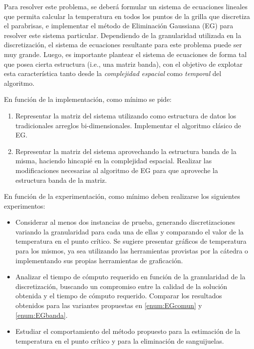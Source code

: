 \documentclass[11pt, a4paper]{article}
\newcommand{\atacante}{sanguijuela}
\newcommand{\objeto}{parabrisas}
\begin{document}
Para resolver este problema, se deber\'a formular un sistema de ecuaciones lineales que permita calcular la temperatura en todos los puntos de la grilla que discretiza el \objeto, e implementar el m\'etodo de Eliminaci\'on Gaussiana (EG) para resolver este sistema particular. Dependiendo de la granularidad utilizada en la discretizaci\'on, el sistema de ecuaciones resultante para este problema puede ser muy grande. Luego, es importante plantear el sistema de ecuaciones de forma tal que posea cierta estructura (i.e., una matriz banda), con el objetivo de explotar esta caracter\'istica tanto desde la \emph{complejidad espacial} como \emph{temporal} del algoritmo.

En funci\'on de la implementaci\'on, como m\'inimo se pide:
\begin{enumerate}
\item Representar la matriz del sistema utilizando como estructura de datos los tradicionales arreglos bi-dimensionales. Implementar el algoritmo cl\'asico de EG. \label{enum:EGcomun}
\item Representar la matriz del sistema aprovechando la estructura banda de la misma, haciendo hincapi\'e en la complejidad espacial.  Realizar las modificaciones necesarias al algoritmo de EG para que aproveche la estructura banda de la matriz. \label{enum:EGbanda}
\end{enumerate}

En funci\'on de la experimentaci\'on, como m\'inimo deben realizarse los siguientes experimentos:

\begin{itemize}
\item Considerar al menos dos instancias de prueba, generando discretizaciones variando la granularidad para cada una de ellas y comparando el valor de la temperatura en el punto cr\'itico. Se sugiere presentar gr\'aficos de temperatura para los mismos, ya sea utilizando las herramientas provistas por la c\'atedra o implementando sus propias herramientas de graficaci\'on. 
\item Analizar el tiempo de c\'omputo requerido en funci\'on de la granularidad de la discretizaci\'on, buscando un compromiso entre la calidad de la soluci\'on obtenida y el tiempo de c\'omputo requerido. Comparar los resultados obtenidos para las variantes propuestas en \ref{enum:EGcomun} y \ref{enum:EGbanda}. 
\item Estudiar el comportamiento del m\'etodo propuesto para la estimaci\'on de la temperatura en el punto cr\'itico y para la eliminaci\'on de \atacante s.
\end{itemize}
\end{document}
